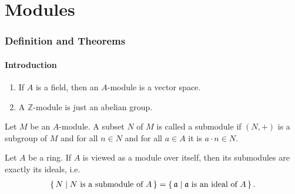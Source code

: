 \chapter{Modules}
\subsection*{Definition and Theorems}
\subsubsection*{Introduction}
\begin{defbox}
    \begin{definition}[Module]
    \end{definition}
\end{defbox}

\begin{exmbox}
    \begin{example}
        \begin{enumerate}
            \item If \(A\) is a field, then an \(A\)-module is a vector space.
            \item A \(\mathbb{Z}\)-module is just an abelian group.
        \end{enumerate}
    \end{example}
\end{exmbox}

\begin{defbox}
    \begin{definition}[Submodules]
        Let \(M\) be an \(A\)-module. A subset \(N\) of \(M\) is called a submodule if \((N, +)\) is a subgroup of \(M\) and for all \(n \in N\) and for all \(a \in A\) it is \(a \cdot n \in N\).
    \end{definition}
\end{defbox}


\begin{thmbox}
    \begin{proposition}
        Let \(A\) be a ring. If \(A\) is viewed as a module over itself, then its submodules are exactly its ideals, i.e.
        \begin{align*}
            \left\{\, N \mid N \text{ is a submodule of } A \,\right\} = \left\{\, \mathfrak{a} \mid \mathfrak{a} \text{ is an ideal of } A \,\right\}\text{.}
        \end{align*}
    \end{proposition}
\end{thmbox}


